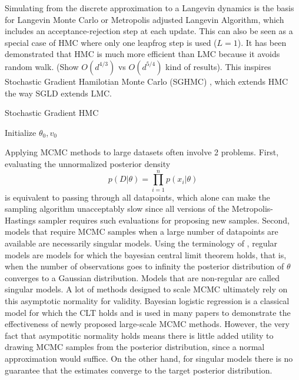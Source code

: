 \documentclass[]{report}
\begin{document}
Simulating from the discrete approximation to a Langevin dynamics is the basis
for Langevin Monte Carlo or Metropolis adjusted Langevin Algorithm, which
includes an acceptance-rejection step at each update. This can also be seen as a
special case of HMC where only one leapfrog step is used ($L=1$). It has been
demonstrated that HMC is much more efficient than LMC because it avoids random
walk. (Show $O(d^{4/3})$ vs $O(d^{5/4})$ kind of results). This inspires
Stochastic Gradient Hamilotian Monte Carlo (SGHMC) ,
which extends HMC the way SGLD extends LMC. 

\begin{algorithm}
    \caption{Stochastic Gradient HMC}
        Initialize $\theta_0,v_0$ \;
\end{algorithm}

Applying MCMC methods to large datasets often involve 2 problems. First, evaluating the unnormalized posterior density
\[ p(D|\theta) = \prod_{i=1}^n p(x_i|\theta) \]
 is equivalent to passing through all datapoints, which alone can make the sampling algorithm unacceptably slow since all versions of the Metropolis-Hastings sampler requires such evaluations for proposing new samples. Second, models that require MCMC samples when a large number of datapoints are available are necessarily singular models. Using the terminology of \cite{watanabe2009algebraic}, regular models are models for which the bayesian central limit theorem \cite{le2012asymptotic} holds, that is, when the number of observations goes to infinity the posterior distribution of $\theta$ converges to a Gaussian distribution. Models that are non-regular are called singular models. A lot of methods designed to scale MCMC \cite{neiswanger2013asymptotically,scott2016bayes,} ultimately rely on this asymptotic normality for validity. Bayesian logistic regression is a classical model for which the CLT holds and is used in many papers to demonstrate the effectiveness of newly proposed large-scale MCMC methods. However, the very fact that asympotitic normality holds means there is little added utility to drawing MCMC samples from the posterior distribution, since a normal approximation would suffice. On the other hand, for singular models there is no guarantee that the estimates converge to the target posterior distribution. 
\end{document}
